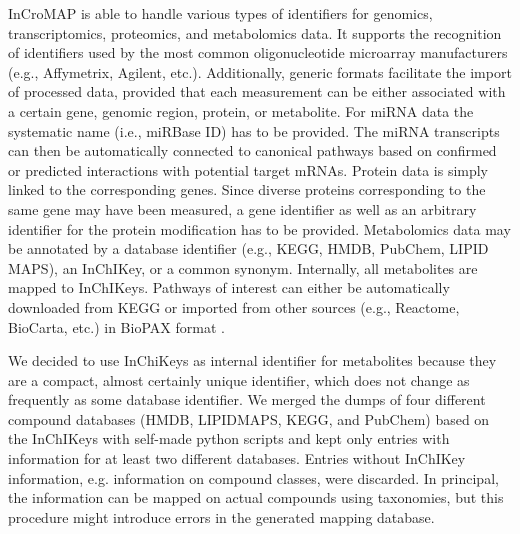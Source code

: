 \documentclass[final,5p,times,twocolumn]{elsarticle}
\newcommand\red[1]{{\color{red}#1}}
\begin{document}
InCroMAP is able to handle various types of identifiers for genomics, transcriptomics, proteomics, and metabolomics data. It supports the recognition of identifiers used by the most common oligonucleotide microarray manufacturers (e.g., Affymetrix, Agilent, etc.). Additionally, generic formats facilitate the import of processed data, provided that each measurement can be either associated with a certain gene, genomic region, protein, or metabolite. \red{For miRNA data the systematic name (i.e., miRBase ID) has to be provided. The miRNA transcripts can then be automatically connected to canonical pathways based on confirmed or predicted interactions with potential target mRNAs. Protein data is simply linked to the corresponding genes. Since diverse proteins corresponding to the same gene may have been measured, a gene identifier as well as an arbitrary identifier for the protein modification has to be provided.} Metabolomics data may be annotated by a database identifier (e.g., KEGG, HMDB, PubChem, LIPID MAPS), an InChIKey, or a common synonym. Internally, all metabolites are mapped to InChIKeys. Pathways of interest can either be automatically downloaded from KEGG or imported from other sources (e.g., Reactome, BioCarta, etc.) in BioPAX format \cite{Eustachio2011}.

\red{We decided to use InChiKeys as internal identifier for metabolites because they are a compact, almost certainly unique identifier, which does not change as frequently as some database identifier. We merged the dumps of four different compound databases (HMDB, LIPIDMAPS, KEGG, and PubChem) based on the InChIKeys with self-made python scripts and kept only entries with information for at least two different databases. Entries without InChIKey information, e.g. information on compound classes,  were discarded. In principal, the information can be mapped on actual compounds using taxonomies, but this procedure might introduce errors in the generated mapping database.}
\end{document}
